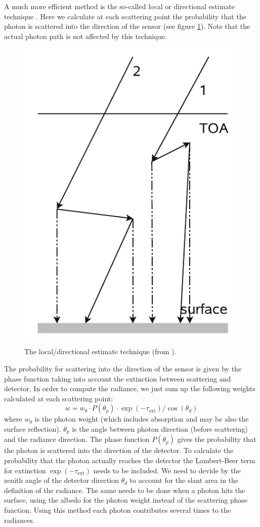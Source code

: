 \documentclass[12pt,twoside,a4paper]{article}
\begin{document}
A much more efficient method is the so-called local or directional
estimate technique \citep{mayer2009, marshak2005}. Here we calculate
at each scattering point the probability that the photon is scattered
into the direction of the sensor (see figure \ref{fig:loc_est}). Note that the actual photon path is
not affected by this technique. 
\begin{figure}[htbp]
  \centering
  \includegraphics[width=0.4\hsize]{./figs/local_estimate.png}\\
  \caption{The local/directional estimate technique (from
    \citet{mayer2009}).}
  \label{fig:loc_est}
\end{figure}
The probability for scattering into
the direction of the sensor is given by the phase function taking into
account the extinction between scattering and detector. In order to
compute the radiance, we just sum up the following weights calculated
at each scattering point: 
\begin{equation}
  w=w_0 \cdot P(\theta_p) \cdot \exp(-\tau_\mathrm{ext}) / \cos(\theta_d)
\end{equation}
where $w_0$ is the photon weight (which includes absorption and may be
also the surface reflection). $\theta_p$ is the angle between photon
direction (before scattering) and the radiance direction. The phase
function $P(\theta_p)$ gives the probability that the photon is
scattered into the direction of the detector. To calculate the
probability that the photon actually reaches the detector the
Lambert-Beer term for extinction $ \exp(-\tau_\mathrm{ext})$ needs to
be included. We need to devide by the zenith angle of the detector
direction $\theta_d$ to account for the slant area in the definition of
the radiance. The same needs to be done when a photon hits the
surface, using the albedo for the photon weight instead of the
scattering phase function. 
Using this method each photon contributes several times to the
radiances. 
\end{document}
